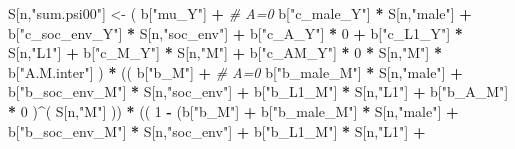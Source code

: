 \documentclass[
]{book}
\newenvironment{Shaded}{\begin{snugshade}}{\end{snugshade}}
\newcommand{\CommentTok}[1]{\textcolor[rgb]{0.56,0.35,0.01}{\textit{#1}}}
\newcommand{\DecValTok}[1]{\textcolor[rgb]{0.00,0.00,0.81}{#1}}
\newcommand{\NormalTok}[1]{#1}
\newcommand{\OtherTok}[1]{\textcolor[rgb]{0.56,0.35,0.01}{#1}}
\newcommand{\SpecialCharTok}[1]{\textcolor[rgb]{0.81,0.36,0.00}{\textbf{#1}}}
\newcommand{\StringTok}[1]{\textcolor[rgb]{0.31,0.60,0.02}{#1}}
\begin{document}
\begin{Shaded}
\begin{Highlighting}[]
\NormalTok{    S[n,}\StringTok{"sum.psi00"}\NormalTok{] }\OtherTok{\textless{}{-}}\NormalTok{  ( b[}\StringTok{"mu\_Y"}\NormalTok{] }\SpecialCharTok{+}                                          \CommentTok{\# A=0}
\NormalTok{                             b[}\StringTok{"c\_male\_Y"}\NormalTok{] }\SpecialCharTok{*}\NormalTok{ S[n,}\StringTok{"male"}\NormalTok{] }\SpecialCharTok{+} 
\NormalTok{                             b[}\StringTok{"c\_soc\_env\_Y"}\NormalTok{] }\SpecialCharTok{*}\NormalTok{ S[n,}\StringTok{"soc\_env"}\NormalTok{] }\SpecialCharTok{+} 
\NormalTok{                             b[}\StringTok{"c\_A\_Y"}\NormalTok{] }\SpecialCharTok{*} \DecValTok{0} \SpecialCharTok{+} 
\NormalTok{                             b[}\StringTok{"c\_L1\_Y"}\NormalTok{] }\SpecialCharTok{*}\NormalTok{ S[n,}\StringTok{"L1"}\NormalTok{] }\SpecialCharTok{+}
\NormalTok{                             b[}\StringTok{"c\_M\_Y"}\NormalTok{] }\SpecialCharTok{*}\NormalTok{ S[n,}\StringTok{"M"}\NormalTok{] }\SpecialCharTok{+}
\NormalTok{                             b[}\StringTok{"c\_AM\_Y"}\NormalTok{] }\SpecialCharTok{*} \DecValTok{0} \SpecialCharTok{*}\NormalTok{ S[n,}\StringTok{"M"}\NormalTok{] }\SpecialCharTok{*}\NormalTok{ b[}\StringTok{"A.M.inter"}\NormalTok{] ) }\SpecialCharTok{*}
\NormalTok{      (( b[}\StringTok{"b\_M"}\NormalTok{] }\SpecialCharTok{+}                                                             \CommentTok{\# A\textquotesingle{}=0}
\NormalTok{           b[}\StringTok{"b\_male\_M"}\NormalTok{] }\SpecialCharTok{*}\NormalTok{ S[n,}\StringTok{"male"}\NormalTok{] }\SpecialCharTok{+} 
\NormalTok{           b[}\StringTok{"b\_soc\_env\_M"}\NormalTok{] }\SpecialCharTok{*}\NormalTok{ S[n,}\StringTok{"soc\_env"}\NormalTok{] }\SpecialCharTok{+} 
\NormalTok{           b[}\StringTok{"b\_L1\_M"}\NormalTok{] }\SpecialCharTok{*}\NormalTok{ S[n,}\StringTok{"L1"}\NormalTok{] }\SpecialCharTok{+}
\NormalTok{           b[}\StringTok{"b\_A\_M"}\NormalTok{] }\SpecialCharTok{*} \DecValTok{0}\NormalTok{ )}\SpecialCharTok{\^{}}\NormalTok{( S[n,}\StringTok{"M"}\NormalTok{] )) }\SpecialCharTok{*}
\NormalTok{      (( }\DecValTok{1} \SpecialCharTok{{-}}\NormalTok{ (b[}\StringTok{"b\_M"}\NormalTok{] }\SpecialCharTok{+} 
\NormalTok{                b[}\StringTok{"b\_male\_M"}\NormalTok{] }\SpecialCharTok{*}\NormalTok{ S[n,}\StringTok{"male"}\NormalTok{] }\SpecialCharTok{+} 
\NormalTok{                b[}\StringTok{"b\_soc\_env\_M"}\NormalTok{] }\SpecialCharTok{*}\NormalTok{ S[n,}\StringTok{"soc\_env"}\NormalTok{] }\SpecialCharTok{+} 
\NormalTok{                b[}\StringTok{"b\_L1\_M"}\NormalTok{] }\SpecialCharTok{*}\NormalTok{ S[n,}\StringTok{"L1"}\NormalTok{] }\SpecialCharTok{+}

\end{Highlighting}
\end{Shaded}
\end{document}
